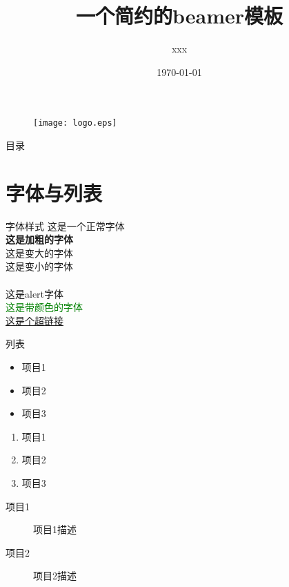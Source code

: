 \documentclass[compress,aspectratio=169]{beamer}
\title{一个简约的beamer模板}
\author{xxx}
\institute{厦门大学管理学院}
\date{\today}
\begin{document}

\begin{frame}[plain]
  \begin{figure}
  	\texttt{[image: logo.eps]}
  \end{figure}
  \titlepage
\end{frame}

\begin{frame}{目录}
	\tableofcontents[sectionstyle=show,subsectionstyle=show/shaded/hide,subsubsectionstyle=show/shaded/hide]
\end{frame}

\section{字体与列表}
\begin{frame}{字体样式}
	这是一个正常字体\\
	\textbf{这是加粗的字体}\\
	{\Large 这是变大的字体}\\
	{\small 这是变小的字体}\\
	\\
	\alert{这是alert字体}\\
	\textcolor{green}{这是带颜色的字体}\\
	\href{https://www.baidu.com}{这是个超链接}
\end{frame}

\begin{frame}{列表}
	\begin{itemize}
		\item 项目1
		\item 项目2
		\item 项目3
	\end{itemize}
	\begin{enumerate}
		\item 项目1
		\item 项目2
		\item 项目3
	\end{enumerate}
	\begin{description}
		\item[项目1] 项目1描述
		\item[项目2] 项目2描述  
	\end{description}
\end{frame}
\end{document}
